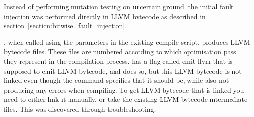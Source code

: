 Instead of performing mutation testing on uncertain ground, the initial fault injection was performed directly in LLVM bytecode as described in section~\ref{section:bitwise_fault_injection}.

\taffo{}, when called using the parameters in the existing compile script, produces LLVM bytecode files. These files are numbered according to which optimisation pass they represent in the \taffo{} compilation process. \taffo{} has a flag called emit-llvm that is supposed to emit LLVM bytecode, and does so, but this LLVM bytecode is not linked even though the \taffo{} command specifies that it should be, while also not producing any errors when compiling. To get LLVM bytecode that is linked you need to either link it manually, or take the existing LLVM bytecode intermediate files. This was discovered through troubleshooting. 


